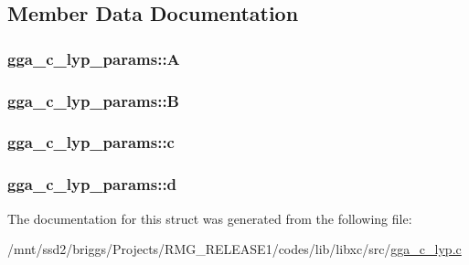 \subsection{Member Data Documentation}
\hypertarget{structgga__c__lyp__params_a68dfbfdfe2ac77a3f7e7c05269cbce48}{
\subsubsection[{A}]{ gga\-\_\-c\-\_\-lyp\-\_\-params\-::\-A}}\label{structgga__c__lyp__params_a68dfbfdfe2ac77a3f7e7c05269cbce48}
\hypertarget{structgga__c__lyp__params_a1f3d609e41b6747c14faf4fe5301d158}{
\subsubsection[{B}]{ gga\-\_\-c\-\_\-lyp\-\_\-params\-::\-B}}\label{structgga__c__lyp__params_a1f3d609e41b6747c14faf4fe5301d158}
\hypertarget{structgga__c__lyp__params_a76d9898b63b2c62f70ba37ce8cbd5453}{
\subsubsection[{c}]{ gga\-\_\-c\-\_\-lyp\-\_\-params\-::c}}\label{structgga__c__lyp__params_a76d9898b63b2c62f70ba37ce8cbd5453}
\hypertarget{structgga__c__lyp__params_a9e843ac7fd3ab54269cddfc2b2340ce8}{
\subsubsection[{d}]{ gga\-\_\-c\-\_\-lyp\-\_\-params\-::d}}\label{structgga__c__lyp__params_a9e843ac7fd3ab54269cddfc2b2340ce8}


The documentation for this struct was generated from the following file\-:\begin{DoxyCompactItemize}
\item 
/mnt/ssd2/briggs/\-Projects/\-R\-M\-G\-\_\-\-R\-E\-L\-E\-A\-S\-E1/codes/lib/libxc/src/\hyperlink{gga__c__lyp_8c}{gga\-\_\-c\-\_\-lyp.\-c}\end{DoxyCompactItemize}
